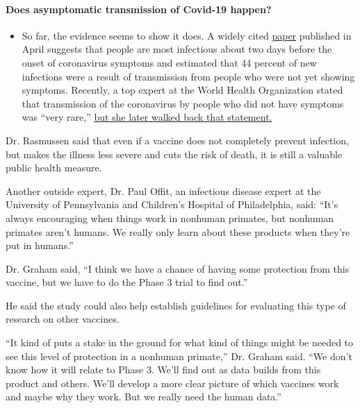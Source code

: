 \begin{itemize}
{  \paragraph{Does asymptomatic transmission of Covid-19
  happen?}\label{does-asymptomatic-transmission-of-covid-19-happen}}

  \begin{itemize}
  \tightlist
  \item
    So far, the evidence seems to show it does. A widely cited
    \href{https://www.nature.com/articles/s41591-020-0869-5}{paper}
    published in April suggests that people are most infectious about
    two days before the onset of coronavirus symptoms and estimated that
    44 percent of new infections were a result of transmission from
    people who were not yet showing symptoms. Recently, a top expert at
    the World Health Organization stated that transmission of the
    coronavirus by people who did not have symptoms was ``very rare,''
    \href{https://www.nytimes.com/2020/06/09/world/coronavirus-updates.html?action=click\&pgtype=Article\&state=default\&region=MAIN_CONTENT_3\&context=storylines_faq\#link-1f302e21}{but
    she later walked back that statement.}
  \end{itemize}
\end{itemize}

Dr. Rasmussen said that even if a vaccine does not completely prevent
infection, but makes the illness less severe and cuts the risk of death,
it is still a valuable public health measure.

Another outside expert, Dr. Paul Offit, an infectious disease expert at
the University of Pennsylvania and Children's Hospital of Philadelphia,
said: ``It's always encouraging when things work in nonhuman primates,
but nonhuman primates aren't humans. We really only learn about these
products when they're put in humans.''

Dr. Graham said, ``I think we have a chance of having some protection
from this vaccine, but we have to do the Phase 3 trial to find out.''

He said the study could also help establish guidelines for evaluating
this type of research on other vaccines.

``It kind of puts a stake in the ground for what kind of things might be
needed to see this level of protection in a nonhuman primate,'' Dr.
Graham said. ``We don't know how it will relate to Phase 3. We'll find
out as data builds from this product and others. We'll develop a more
clear picture of which vaccines work and maybe why they work. But we
really need the human data.''

